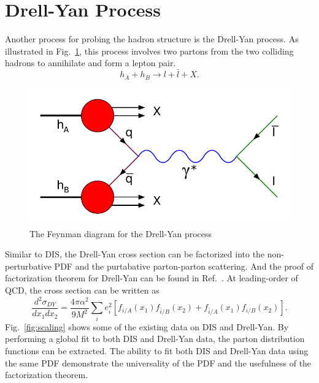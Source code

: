 \section{Drell-Yan Process}
\label{sec:DY}
Another process for probing the hadron structure is the Drell-Yan process\cite{drell1970}.
As illustrated in Fig.\ \ref{fig:DY}, this process involves two partons from the 
two colliding hadrons to annihilate and form a lepton pair.
\begin{equation}
	h_A + h_B \rightarrow l + \bar{l} + X.
\end{equation}
\begin{figure}[htbp!]
	\centering
	\includegraphics[width=0.5\linewidth]{images/Drell-Yan}
    \caption{The Feynman diagram for the Drell-Yan process}
    \label{fig:DY}
\end{figure}
Similar to DIS, the Drell-Yan cross section can be factorized into the non-perturbative
PDF and the purtabative parton-parton scattering. And the proof of factorization 
theorem for Drell-Yan can be found in Ref.\ \cite{collins1989}. At leading-order 
of QCD, the cross section can be written as
\begin{equation}
	\frac{d^2\sigma_{DY}}{dx_{1}dx_{2}} = \frac{4\pi\alpha^2}{9M^2}\sum_i e^2_i
		\left[f_{i/A}\left(x_1\right)f_{\bar{i}/B}\left(x_2\right) +
			f_{\bar{i}/A}\left(x_1\right)f_{i/B}\left(x_2\right)
		\right].
	\label{eq:DY_cs}
\end{equation}
Fig.\ \ref{fig:scaling} shows some of the existing data on DIS and Drell-Yan. By
performing a global fit to both DIS and Drell-Yan data, the parton distribution 
functions can be extracted. The ability to fit both DIS and Drell-Yan data using 
the same PDF demonstrate the universality of the PDF and the usefulness of the 
factorization theorem. 
